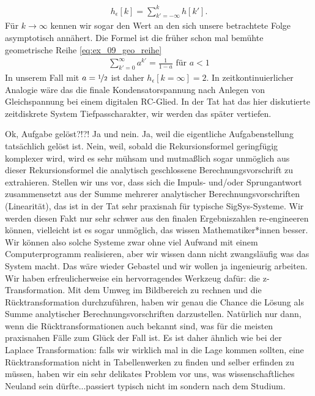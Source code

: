 \begin{Ansatz}
\begin{align}
h_\epsilon[k] = \sum_{k'=-\infty}^{k} h[k'].
\end{align}
%
Für $k \to \infty$ kennen wir sogar den Wert an den sich unsere betrachtete Folge
asymptotisch annähert. Die Formel ist die früher schon mal bemühte
geometrische Reihe \eqref{eq:ex_09_geo_reihe}
\begin{align}
\sum_{k'=0}^{\infty} a^{k'} = \frac{1}{1-a}\text{ für } a<1
\end{align}
In unserem Fall mit $a=\nicefrac{1}{2}$ ist daher $h_\epsilon[k=\infty] = 2$.
In zeitkontinuierlicher Analogie wäre das die finale Kondensatorspannung
nach Anlegen von Gleichspannung bei einem digitalen RC-Glied. In der Tat hat
das hier diskutierte zeitdiskrete System Tiefpasscharakter,
wir werden das später vertiefen.

Ok, Aufgabe gelöst?!?! Ja und nein. Ja, weil die eigentliche Aufgabenstellung
tatsächlich gelöst ist. Nein, weil, sobald die Rekursionsformel geringfügig
komplexer wird, wird es sehr mühsam und mutmaßlich sogar unmöglich aus dieser
Rekursionsformel die analytisch geschlossene Berechnungsvorschrift zu extrahieren.
Stellen wir uns vor, dass sich die Impuls- und/oder Sprungantwort zusammensetzt
aus der Summe mehrerer analytischer Berechnungsvorschriften (Linearität),
das ist in der Tat sehr praxisnah für typische SigSys-Systeme. Wir werden diesen
Fakt nur sehr schwer aus den finalen Ergebniszahlen re-engineeren können, vielleicht
ist es sogar unmöglich, das wissen Mathematiker*innen besser.
Wir können also solche Systeme zwar ohne viel Aufwand mit einem Computerprogramm
realisieren, aber wir wissen dann nicht zwangsläufig was das System macht.
Das wäre wieder Gebastel und wir wollen ja ingenieurig arbeiten.
%
Wir haben erfreulicherweise ein hervorragendes Werkzeug dafür: die z-Transformation.
Mit dem Umweg im Bildbereich zu rechnen und die Rücktransformation durchzuführen,
haben wir genau die Chance die Lösung als Summe analytischer Berechnungsvorschriften
darzustellen. Natürlich nur dann, wenn die Rücktransformationen auch bekannt sind,
was für die meisten praxisnahen Fälle zum Glück der Fall ist. Es ist daher ähnlich
wie bei der Laplace Transformation: falls wir wirklich mal in die Lage kommen
sollten, eine Rücktransformation nicht in Tabellenwerken zu finden und selber
erfinden zu müssen, haben wir ein sehr delikates Problem vor uns, was
wissenschaftliches Neuland sein dürfte...passiert typisch nicht im sondern nach dem Studium.
\end{Ansatz}

